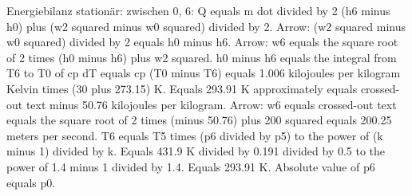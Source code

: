 Energiebilanz stationär: zwischen 0, 6:
Q equals m dot divided by 2 (h6 minus h0) plus (w2 squared minus w0 squared) divided by 2.
Arrow: (w2 squared minus w0 squared) divided by 2 equals h0 minus h6.
Arrow: w6 equals the square root of 2 times (h0 minus h6) plus w2 squared.
h0 minus h6 equals the integral from T6 to T0 of cp dT equals cp (T0 minus T6) equals 1.006 kilojoules per kilogram Kelvin times (30 plus 273.15) K.
Equals 293.91 K approximately equals crossed-out text minus 50.76 kilojoules per kilogram.
Arrow: w6 equals crossed-out text equals the square root of 2 times (minus 50.76) plus 200 squared equals 200.25 meters per second.
T6 equals T5 times (p6 divided by p5) to the power of (k minus 1) divided by k.
Equals 431.9 K divided by 0.191 divided by 0.5 to the power of 1.4 minus 1 divided by 1.4.
Equals 293.91 K.
Absolute value of p6 equals p0.